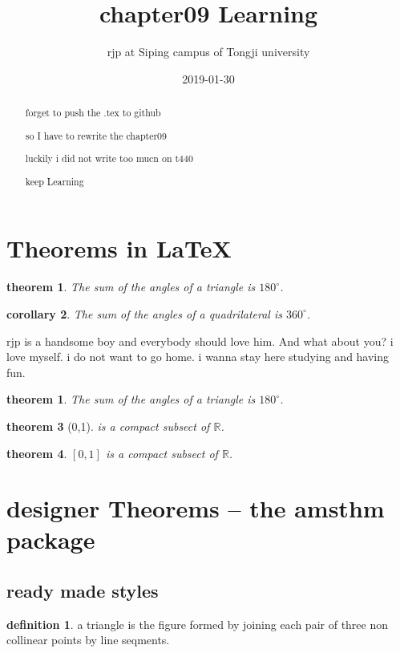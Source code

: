 \documentclass[a4paper, UTF8]{article}
\newtheorem{thmm}{theorem}[section]
\newtheorem{thmm01}{theorem}[section]
\newtheorem{cor}[thmm]{corollary}
\theoremstyle{definition}
\newtheorem{dfn}{definition}[section]
\theoremstyle{remark}
\theoremstyle{plain}
\begin{document}
\title{\Huge chapter09 Learning}
\author{rjp at Siping campus of Tongji university}
\date{2019-01-30}
\maketitle
\begin{abstract}
    forget to push the .tex to github 

    so I have to rewrite the chapter09

    luckily i did not write too mucn on t440

    keep Learning
\end{abstract}
\thispagestyle{empty}   %
\newpage
\tableofcontents
\newpage

\section{\Large Theorems in \LaTeX}
\begin{thmm}
    The sum of the angles of a triangle is $180^\circ$.
\end{thmm}

\begin{cor}
    The sum of the angles of a quadrilateral is $360^\circ$.
\end{cor}

rjp is a handsome boy and everybody should love him. And what about you? i love myself. i do not want to go home. i wanna stay here studying and having fun.

\begin{thmm01}
    The sum of the angles of a triangle is $180^\circ$.
\end{thmm01}

\begin{thmm}
    [0,1] is a compact subsect of $\mathbb{R}$.    
\end{thmm}

\begin{thmm}
    $[0,1]$ is a compact subsect of $\mathbb{R}$.    
\end{thmm}
\newpage

\section{\Large designer Theorems -- the amsthm package}
\subsection{\large ready made styles}
\begin{dfn}
    a triangle is the figure formed by joining each pair of three non collinear points by line seqments.
\end{dfn}
\end{document}
